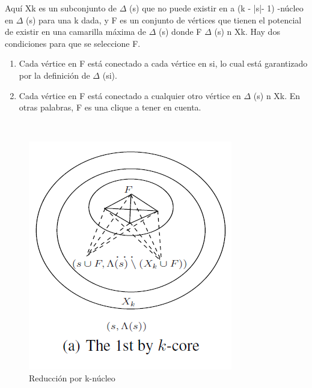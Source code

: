 Aquí Xk es un subconjunto de \begin{math}\Delta\end{math} (s) que no puede existir en a (k - |s|- 1) -núcleo en \begin{math}\Delta\end{math} (s) para una k dada, y F es un conjunto de vértices que tienen el potencial de existir en una camarilla máxima de \begin{math}\Delta\end{math} (s) donde F \begin{math}\Delta\end{math} (s) n Xk. Hay dos condiciones para que se seleccione F.
\begin{enumerate}
    \item Cada vértice en F está conectado a cada vértice en si, lo cual está garantizado por la definición de \begin{math}\Delta\end{math} (si).
    \item Cada vértice en F está conectado a cualquier otro vértice en \begin{math}\Delta\end{math} (s) n Xk. En otras palabras, F es una clique a tener en cuenta.
\end{enumerate}
\\
\begin{figure}[h!]
\centering
\includegraphics[scale=.5]{img/imagen4.png}
\caption{Reducción por k-núcleo}
\label{Comandos}
\end{figure}
\\
